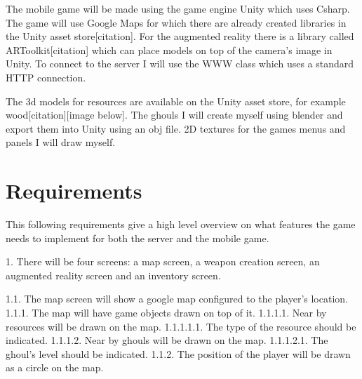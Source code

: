 \documentclass[11pt,openright,a4paper]{report}
\newcommand{\forceindent}{\leavevmode{\parindent=1em\indent}}
\begin{document}
		The mobile game will be made using the game engine Unity which uses Csharp. The game will use Google Maps for which there are already created libraries in the Unity asset store[citation]. For the augmented reality there is a library called ARToolkit[citation] which can place models on top of the camera's image in Unity. To connect to the server I will use the WWW class which uses a standard HTTP connection. 
		
		The 3d models for resources are available on the Unity asset store, for example wood[citation][image below]. The ghouls I will create myself using blender and export them into Unity using an obj file. 2D textures for the games menus and panels I will draw myself. 
		
		\section{Requirements}
		This following requirements give a high level overview on what features the game needs to implement for both the server and the mobile game. \newline
		
		1. There will be four screens: a map screen, a weapon creation screen, an augmented reality screen and an inventory screen.
		
		\forceindent 1.1. The map screen will show a google map configured to the player's location.\newline
		\forceindent \forceindent 1.1.1. The map will have game objects drawn on top of it. \newline
		\forceindent \forceindent \forceindent 1.1.1.1. Near by resources will be drawn on the map.\newline
		\forceindent \forceindent \forceindent \forceindent 1.1.1.1.1. The type of the resource should be indicated.\newline
		\forceindent \forceindent \forceindent 1.1.1.2. Near by ghouls will be drawn on the map.\newline
		\forceindent \forceindent \forceindent \forceindent 1.1.1.2.1. The ghoul's level should be indicated.\newline
		\forceindent \forceindent 1.1.2. The position of the player will be drawn as a circle on the map.\newline
		
\end{document}
